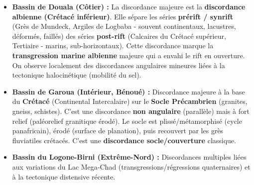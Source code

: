 \documentclass[11pt]{article}
\begin{document}
\begin{savaistu}
\begin{itemize}
    \item \textbf{Bassin de Douala (Côtier) :} La discordance majeure est la \textbf{discordance albienne (Crétacé inférieur)}. Elle sépare les séries \textbf{prérift / synrift} (Grès de Mundeck, Argiles de Logbaba - souvent continentaux, lacustres, déformés, faillés) des séries \textbf{post-rift} (Calcaires du Crétacé supérieur, Tertiaire - marins, sub-horizontaux). Cette discordance marque la \textbf{transgression marine albienne} majeure qui a envahi le rift en ouverture. On observe localement des discordances angulaires mineures liées à la tectonique halocinétique (mobilité du sel).
    \item \textbf{Bassin de Garoua (Intérieur, Bénoué) :} Discordance majeure à la base du \textbf{Crétacé} (Continental Intercalaire) sur le \textbf{Socle Précambrien} (granites, gneiss, schistes). C'est une discordance \textbf{non angulaire} (parallèle) mais à fort relief (paléorelief granitique érodé). Le socle est plissé/métamorphisé (cycle panafricain), érodé (surface de planation), puis recouvert par les grès fluviatiles crétacés. C'est une \textbf{discordance socle/couverture} classique.
    \item \textbf{Bassin du Logone-Birni (Extrême-Nord) :} Discordances multiples liées aux variations du Lac Mega-Chad (transgressions/régressions quaternaires) et à la tectonique distensive récente.
\end{itemize}
\end{savaistu}
\end{document}
